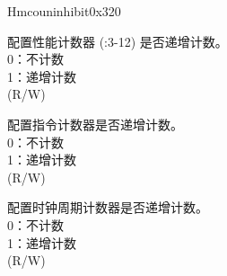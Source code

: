 \begin{register}{H}{mcouninhibit}{0x320}\label{regdesc:LPMCOUNTINHIBIT}
%
%
%
%
\regnewline%
\begin{regdesc}\begin{reglist}
\label{fielddesc:LPMCOUNTINHIBITHPM}\item [HPM] 配置性能计数器 (:3-12) 是否递增计数。\\
0：不计数\\
1：递增计数\\
(R/W)
\label{fielddesc:LPMCOUNTINHIBITIR}\item [IR] 配置指令计数器是否递增计数。\\
0：不计数\\
1：递增计数\\
(R/W)
\label{fielddesc:LPMCOUNTINHIBITCY}\item [CY] 配置时钟周期计数器是否递增计数。\\
0：不计数\\
1：递增计数\\
(R/W)
\end{reglist}\end{regdesc}
\end{register}
